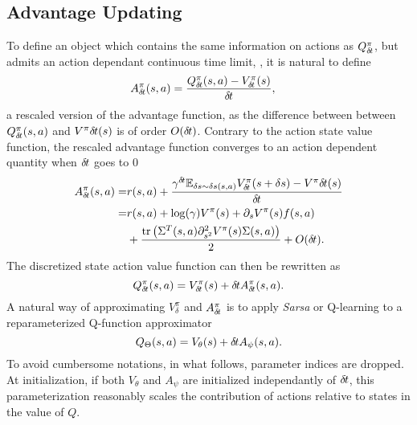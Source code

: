 \subsection{Advantage Updating}
\label{subsec:reparam}
To define an object which contains the same information on actions as
$Q^\pi_{\delta\hspace{-.1em}t}$, but admits an action dependant continuous time limit, , it is
natural to define
\begin{align}
	A^\pi_{\delta\hspace{-.1em}t}(s, a) &= \frac{Q^\pi_{\delta\hspace{-.1em}t}(s,a) - V^\pi_{\delta\hspace{-.1em}t}(s)}{{\delta\hspace{-.1em}t}},
    \label{eq:adv}
\end{align}
a rescaled version of the advantage function, as the difference between between
$Q^\pi_{\delta\hspace{-.1em}t}(s, a)$ and $V^\pi{\delta\hspace{-.1em}t}(s)$ is of order $O({\delta\hspace{-.1em}t})$.
Contrary to the action state value function, the rescaled advantage function converges
to an action dependent quantity when ${\delta\hspace{-.1em}t}$ goes to $0$
\begin{align}
	A^\pi_{\delta\hspace{-.1em}t}(s, a)=&{r}(s, a)+\frac{\gamma^{{\delta\hspace{-.1em}t}}\mathbb{E}_{\delta s \sim \delta s(s, a)}V^\pi_{\delta\hspace{-.1em}t}(s + \delta s)-V^\pi{\delta\hspace{-.1em}t}(s)}{{\delta\hspace{-.1em}t}}\nonumber\\
	=&{r}(s, a)+\log(\gamma) V^\pi(s)+\partial_s V^\pi(s)f(s, a)\nonumber\\
         &+\frac{\text{tr}\left(\Sigma^T(s, a)\partial^2_{s^2}V^\pi(s) \Sigma(s,a)\right)}{2} + O({\delta\hspace{-.1em}t})\nonumber.
\end{align}
The discretized state action value function can then be rewritten as
\begin{equation}
	Q^\pi_{\delta\hspace{-.1em}t}(s, a) = V^\pi_{\delta\hspace{-.1em}t}(s) + {\delta\hspace{-.1em}t} A^\pi_{\delta\hspace{-.1em}t}(s, a).
	\label{eq:reparam_q_pi}
\end{equation}
A natural way of approximating $V^\pi_\delta$ and $A^\pi_{\delta\hspace{-.1em}t}$ is to apply
\emph{Sarsa} or Q-learning to a reparameterized Q-function approximator
\begin{equation}
	Q_\Theta(s, a) = V_{\theta}(s) + {\delta\hspace{-.1em}t} A_{\psi}(s, a).
\end{equation}
To avoid cumbersome notations, in what follows, parameter indices are dropped.
At initialization, if both $V_{\theta}$ and $A_{\psi}$ are initialized
independantly of ${\delta\hspace{-.1em}t}$, this parameterization reasonably scales the
contribution of actions relative to states in the value of $Q$.  

